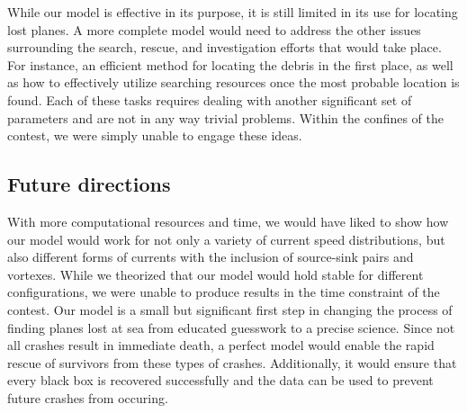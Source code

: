 \documentclass[pre,12pt]{revtex4-1}
\begin{document}
While our model is effective in its purpose, it is still limited in its use for locating lost planes. A more complete model would need to address the other issues surrounding the search, rescue, and investigation efforts that would take place. For instance, an efficient method for locating the debris in the first place, as well as how to effectively utilize searching resources once the most probable location is found. Each of these tasks requires dealing with another significant set of parameters and are not in any way trivial problems. Within the confines of the contest, we were simply unable to engage these ideas.

\subsection{Future directions}

With more computational resources and time, we would have liked to show how our model would work for not only a variety of current speed distributions, but also different forms of currents with the inclusion of source-sink pairs and vortexes. While we theorized that our model would hold stable for different configurations, we were unable to produce results in the time constraint of the contest.
Our model is a small but significant first step in changing the process of finding planes lost at sea from educated guesswork to a precise science. Since not all crashes result in immediate death, a perfect model would enable the rapid rescue of survivors from these types of crashes. Additionally, it would ensure that every black box is recovered successfully and the data can be used to prevent future crashes from occuring.
\end{document}
